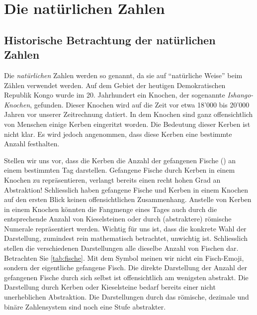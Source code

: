 \chapter{Die natürlichen Zahlen}\label{ch:Kapitel01}
\section{Historische Betrachtung der natürlichen Zahlen}\label{sec:history}
Die \textit{natürlichen} Zahlen werden so genannt, da sie auf \enquote{natürliche Weise} beim Zählen verwendet werden. Auf dem Gebiet der heutigen Demokratischen Republik Kongo wurde im 20. Jahrhundert ein Knochen, der sogenannte \textit{Ishango-Knochen}, gefunden. Dieser Knochen wird auf die Zeit vor etwa 18'000 bis 20'000 Jahren vor unserer Zeitrechnung datiert. In dem Knochen sind ganz offensichtlich von Menschen einige Kerben eingeritzt worden. Die Bedeutung dieser Kerben ist nicht klar. Es wird jedoch angenommen, dass diese Kerben eine bestimmte Anzahl festhalten. 

Stellen wir uns vor, dass die Kerben die Anzahl der gefangenen Fische () an einem bestimmten Tag darstellen. Gefangene Fische durch Kerben in einem Knochen zu repräsentieren, verlangt bereits einen recht hohen Grad an Abstraktion! Schliesslich haben gefangene Fische und Kerben in einem Knochen auf den ersten Blick keinen offensichtlichen Zusammenhang. Anstelle von Kerben in einem Knochen könnten die Fangmenge eines Tages auch durch die entsprechende Anzahl von Kieselsteinen oder durch (abstraktere) römische Numerale repräsentiert werden. Wichtig für uns ist, dass die konkrete Wahl der Darstellung, zumindest rein mathematisch betrachtet, unwichtig ist. Schliesslich stellen die verschiedenen Darstellungen alle dieselbe Anzahl von Fischen dar. Betrachten Sie \cref{tab:fische}. Mit dem Symbol  meinen wir nicht ein Fisch-Emoji, sondern der eigentliche gefangene Fisch. Die direkte Darstellung der Anzahl der gefangenen Fische durch sich selbst ist offensichtlich am wenigsten abstrakt. Die Darstellung durch Kerben oder Kieselsteine bedarf bereits einer nicht unerheblichen Abstraktion. Die Darstellungen durch das römische, dezimale und binäre Zahlensystem sind noch eine Stufe abstrakter.


